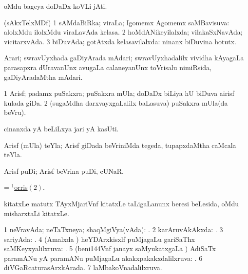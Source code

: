 \bentry
{}
\gl{\nA}
\bmng
oMdu bageya doDaDx koVLi jAti. 
\emng
\eentry

\bentry
{}
\gl{\gu}
\bmng
(sAkxTelxMDf) 
\bnum
\num{1} sAMdaBiRka; viraLa; Igomemx Agomemx saMBavisuva:  alolxMdu ilolxMdu viraLavAda kelasa. 
\num{2} hoMdANikeyilalxda; vilakaSxNavAda; vicitarxvAda. 
\num{3} biDuvAda; gotAtxda kelasavilalxda:  ninanx biDuvina hotutx. 
\enum
\emng
\eentry

\bentry
{}
\gl{\nA}
\bmng
Arari; swravUyxhada gaDiyArada mAdari; swravUyxhadalilx vividha kAyagaLa parasapxra dUravanUnx avugaLa calaneyanUnx toVrisalu nimiRsida, gaDiyAradaMtha mAdari. 
\emng
\eentry

\bentry
{}
\gl{\nA}
\bmng
\bnum
\num{1} Arisf; padamx puSakxra; puSakxra mUla; doDaDx biLiya hU biDuva airisf kulada giDa. 
\hypertarget{orris(1)2}{} 
\num{2} (sugaMdha darxvayxgaLalilx baLasuva) puSakxra mUla(da beVru). 
\enum
\emng
\eentry

\bentry
{}
\gl{\nA}
\bmng
cinanxda yA beLiLxya jari yA kasUti. 
\emng
\eentry

\bentry
{}
\gl{\nA}
\bmng
Arisf (mUla) teYla; Arisf giDada beVriniMda tegeda, tupapxdaMtha caMcala teYla. 
\emng
\eentry

\bentry
{}
\gl{\nA}
\bmng
Arisf puDi; Arisf beVrina puDi, cUNaR. 
\emng
\eentry

\bentry
{}
\gl{\nA}
\bmng
= \hyperlink{orris(1)2}{$^1$orris\((2)\)}. 
\emng
\eentry

\bentry
{}
\gl{\nA}
\bmng
kitatxLe matutx TAyxMjariVnf kitatxLe taLigaLanunx beresi beLesida, oMdu misharxtaLi kitatxLe. 
\emng
\eentry

\bentry
{}
\gl{\sapUpa}
\bmng
\bnum
\num{1} neVravAda; neTaTxneya; shaqMgiVya(vAda): . 
\num{2} karAruvAkAkxda: . 
\num{3} sariyAda: . 
\num{4} (Amalxda \vi) heYDArxkisxlf puMjagaLu gariSaThx saMKeyxyalilxruva: . 
\num{5} (beni\char144Vnf janayx saMyukatxgaLa \vi) AdiSaTx paramANu yA paramANu puMjagaLu akakxpakakxdalilxruva: . 
\num{6} diVGaRcaturasArxkArada. 
\num{7} laMbakoVnadalilxruva. 
\enum
\emng
\eentry

